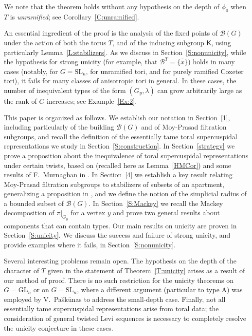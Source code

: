 \documentclass[12pt]{amsart}
\newcommand{\SL}{\mathrm{SL}}
\newcommand{\GL}{\mathrm{GL}}
\newcommand{\buil}{\mathcal{B}}
\newcommand{\KT}{\mathsf{K}}
\theoremstyle{plain}
\theoremstyle{definition}
\theoremstyle{remark}
\numberwithin{equation}{section}
\numberwithin{figure}{section}
\begin{document}
We note that the theorem holds without any hypothesis on the depth of $\phi_0$ when $T$ is \emph{unramified}; see Corollary~\ref{C:unramified}.

An essential ingredient of the proof is the analysis of the fixed points of $\buil(G)$ under the action of both the torus $T$, and of the inducing subgroup $\KT$, using particularly Lemma~\ref{L:stabilizers}.  As we discuss in Section~\ref{S:nonunicity}, while the hypothesis for strong unicity (for example, that $\buil^T = \overline{\{x\}}$) holds in many cases (notably, for $G=\SL_n$, for unramified tori, and for purely ramified Coxeter tori), it fails for many classes of anisotropic tori in general. In these cases, the number of inequivalent types of the form $(G_y,\lambda)$ can grow arbitrarily large as the rank of $G$ increases; see Example~\ref{Ex:2}.

This paper is organized as follows.  We establish our notation in Section~\ref{1}, including particularly of the building $\buil(G)$ and of Moy-Prasad filtration subgroups, and recall the definition of the essentially tame toral supercuspidal representations we study in Section~\ref{S:construction}.   In Section~\ref{strategy} we prove a proposition about the inequivalence of toral supercuspidal representations under certain twists, based on \cite[Cor 6.10]{HakimMurnaghan2008} (recalled here as Lemma~\ref{HMCor}) and some results of F.~Murnaghan in \cite{Murnaghan2011}.  In Section~\ref{4} we establish a key result relating Moy-Prasad filtration subgroups to stabilizers of subsets of an apartment, generalizing a proposition in \cite{Nevins2014}, and we define the notion of the simplicial radius of a bounded subset of $\buil(G)$.  In Section~\ref{S:Mackey} we recall the Mackey decomposition of $\pi|_{G_y}$ for a vertex $y$ and prove two general results about components that can contain types.  
Our main results on unicity are proven in Section~\ref{S:unicity}.  We discuss the success and failure of strong unicity, and provide examples where it fails, in Section~\ref{S:nonunicity}.

Several interesting problems remain open.  The hypothesis on the depth of the character of $T$ given in the statement of Theorem~\ref{T:unicity} arises as a result of our method of proof.  There is no such restriction for the unicity theorems on $G=\GL_n$ or on $G=\SL_n$, where a different argument (particular to type A) was employed by V.~Pa\u{s}k\={u}nas to address the small-depth case.  Finally, not all essentially tame supercuspidal representations arise from toral data; the consideration of general twisted Levi sequences is necessary to completely resolve the unicity conjecture in these cases.
\end{document}
